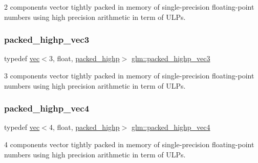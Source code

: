2 components vector tightly packed in memory of single-\/precision floating-\/point numbers using high precision arithmetic in term of U\+L\+Ps. 

\mbox{\label{group__gtc__type__aligned_ga6814dd861e658e724ce9e5e673a4486b}} 
\subsubsection{\texorpdfstring{packed\+\_\+highp\+\_\+vec3}{packed\_highp\_vec3}}
{\footnotesize\ttfamily typedef \hyperlink{structglm_1_1vec}{vec}$<$3, float, \hyperlink{namespaceglm_a36ed105b07c7746804d7fdc7cc90ff25a8e8791ee77fe079b1291f710d88031bf}{packed\+\_\+highp}$>$ \hyperlink{group__gtc__type__aligned_ga6814dd861e658e724ce9e5e673a4486b}{glm\+::packed\+\_\+highp\+\_\+vec3}}



3 components vector tightly packed in memory of single-\/precision floating-\/point numbers using high precision arithmetic in term of U\+L\+Ps. 

\mbox{\label{group__gtc__type__aligned_gabbc42b2b5ad854c60821526c4e291161}} 
\subsubsection{\texorpdfstring{packed\+\_\+highp\+\_\+vec4}{packed\_highp\_vec4}}
{\footnotesize\ttfamily typedef \hyperlink{structglm_1_1vec}{vec}$<$4, float, \hyperlink{namespaceglm_a36ed105b07c7746804d7fdc7cc90ff25a8e8791ee77fe079b1291f710d88031bf}{packed\+\_\+highp}$>$ \hyperlink{group__gtc__type__aligned_gabbc42b2b5ad854c60821526c4e291161}{glm\+::packed\+\_\+highp\+\_\+vec4}}



4 components vector tightly packed in memory of single-\/precision floating-\/point numbers using high precision arithmetic in term of U\+L\+Ps. 

